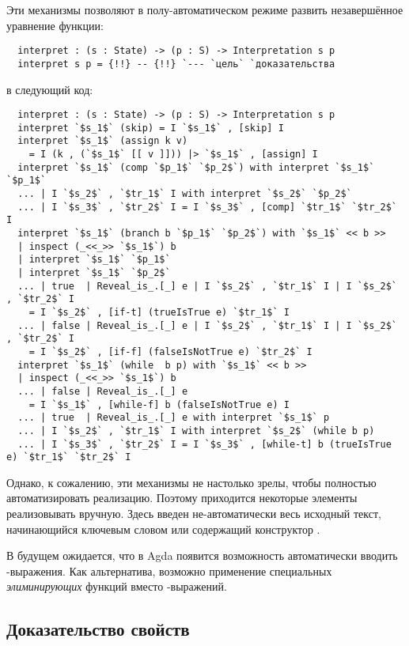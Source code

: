  \noindent\begin{minipage}[c]{\linewidth}
  Эти механизмы позволяют в полу-автоматическом режиме развить незавершённое уравнение функции:
  \begin{lstlisting}
  interpret : (s : State) -> (p : S) -> Interpretation s p
  interpret s p = {!!} -- {!!} `--- `цель` `доказательства
  \end{lstlisting}
  в следующий код:
  \begin{lstlisting}
  interpret : (s : State) -> (p : S) -> Interpretation s p
  interpret `$s_1$` (skip) = I `$s_1$` , [skip] I
  interpret `$s_1$` (assign k v)
    = I (k , (`$s_1$` [[ v ]])) |> `$s_1$` , [assign] I
  interpret `$s_1$` (comp `$p_1$` `$p_2$`) with interpret `$s_1$` `$p_1$`
  ... | I `$s_2$` , `$tr_1$` I with interpret `$s_2$` `$p_2$`
  ... | I `$s_3$` , `$tr_2$` I = I `$s_3$` , [comp] `$tr_1$` `$tr_2$` I
  interpret `$s_1$` (branch b `$p_1$` `$p_2$`) with `$s_1$` << b >>
  | inspect (_<<_>> `$s_1$`) b
  | interpret `$s_1$` `$p_1$`
  | interpret `$s_1$` `$p_2$`
  ... | true  | Reveal_is_.[_] e | I `$s_2$` , `$tr_1$` I | I `$s_2$` , `$tr_2$` I
    = I `$s_2$` , [if-t] (trueIsTrue e) `$tr_1$` I
  ... | false | Reveal_is_.[_] e | I `$s_2$` , `$tr_1$` I | I `$s_2$` , `$tr_2$` I
    = I `$s_2$` , [if-f] (falseIsNotTrue e) `$tr_2$` I
  interpret `$s_1$` (while  b p) with `$s_1$` << b >>
  | inspect (_<<_>> `$s_1$`) b
  ... | false | Reveal_is_.[_] e
    = I `$s_1$` , [while-f] b (falseIsNotTrue e) I
  ... | true  | Reveal_is_.[_] e with interpret `$s_1$` p
  ... | I `$s_2$` , `$tr_1$` I with interpret `$s_2$` (while b p)
  ... | I `$s_3$` , `$tr_2$` I = I `$s_3$` , [while-t] b (trueIsTrue e) `$tr_1$` `$tr_2$` I
  \end{lstlisting}
  \end{minipage}

  Однако, к сожалению, эти механизмы не настолько зрелы, чтобы полностью автоматизировать реализацию. Поэтому приходится некоторые элементы реализовывать вручную. Здесь введен не-автоматически весь исходный текст, начинающийся ключевым словом  или содержащий конструктор .

  В будущем ожидается, что в Agda появится возможность автоматически вводить -выражения. Как альтернатива, возможно применение специальных \emph{элиминирующих} функций вместо -выражений.

  \subsection{Доказательство свойств}

